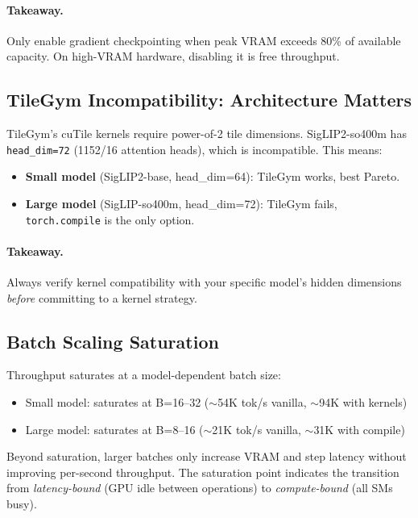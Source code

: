 \documentclass[11pt,a4paper]{article}
\begin{document}
\paragraph{Takeaway.} Only enable gradient checkpointing when peak VRAM exceeds 80\%
of available capacity. On high-VRAM hardware, disabling it is free throughput.

\subsection{TileGym Incompatibility: Architecture Matters}

TileGym's cuTile kernels require power-of-2 tile dimensions. SigLIP2-so400m has
\texttt{head\_dim=72} (1152/16 attention heads), which is incompatible. This means:
\begin{itemize}[leftmargin=*,nosep]
  \item \textbf{Small model} (SigLIP2-base, head\_dim=64): TileGym works, best Pareto.
  \item \textbf{Large model} (SigLIP-so400m, head\_dim=72): TileGym fails,
    \texttt{torch.compile} is the only option.
\end{itemize}

\paragraph{Takeaway.} Always verify kernel compatibility with your specific model's
hidden dimensions \emph{before} committing to a kernel strategy.

\subsection{Batch Scaling Saturation}

Throughput saturates at a model-dependent batch size:
\begin{itemize}[leftmargin=*,nosep]
  \item Small model: saturates at B=16--32 ($\sim$54K tok/s vanilla, $\sim$94K with kernels)
  \item Large model: saturates at B=8--16 ($\sim$21K tok/s vanilla, $\sim$31K with compile)
\end{itemize}
Beyond saturation, larger batches only increase VRAM and step latency without improving
per-second throughput. The saturation point indicates the transition from
\emph{latency-bound} (GPU idle between operations) to \emph{compute-bound} (all SMs busy).

\end{document}
